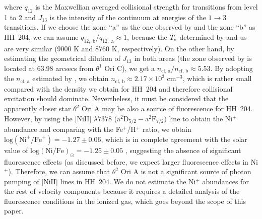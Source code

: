 \documentclass[twocolumn,linenumbers]{aastex63}
\begin{document}
\noindent where $q_{12}$ is the Maxwellian averaged collisional strength for transitions from level 1 to 2 and $J_{13}$ is the intensity of the continuum at energies of the $1 \rightarrow 3$ transitions. If we choose the zone ``a'' as the one observed by \citet{Osterbrock92} and the zone  ``b'' as HH~204, 
we can assume ${q_{12,\text{ b}}}/{q_{12,\text{ a}}}\approx 1$, because the $T_{\rm e}$ determined by \citet{Osterbrock92} and us are very similar (9000 K and 8760 K, respectively). On the other hand, by estimating the geometrical dilution of $J_{13}$ in both areas (the zone observed by \citet{Osterbrock92} is  located at 63.98 arcsecs from $\theta^{1} \text{ Ori C}$), we get a $n_{\text{cf, a}}/n_{\text{cf, b}}\approx5.53$. By adopting the $n_{\text{cf, a}}$ estimated by \citet{Bautista96}, we obtain  $n_{\text{cf, b}}\approx 2.17 \times 10^{3} \text{ cm}^{-3}$, which is rather small compared with the density we obtain for HH~204 and therefore collisional excitation should dominate. Nevertheless, it must be considered that the apparently closer star $\theta^{2} \text{ Ori A}$  may be also a source of fluorescence for HH~204. However, by using the [Ni\thinspace II] $\lambda 7378$ ($\text{a}^{2}\text{D}_{5/2}-\text{a}^{2}\text{F}_{7/2})$ line to obtain the Ni$^{+}$ abundance and comparing with the Fe$^{+}$/H$^+$ ratio, we obtain $\text{log}(\text{Ni}^{+}/\text{Fe}^{+})=-1.27 \pm 0.06$, which is in complete agreement with the solar value of $\text{log}(\text{Ni}/\text{Fe})_{\odot}=-1.25 \pm 0.05$ \citep{lodders19}, suggesting the absence of significant fluorescence effects (as discussed before, we expect larger fluorescence effects in Ni$^+$). Therefore, we can assume that $\theta^{2} \text{ Ori A}$ is not a significant source of photon pumping of [Ni\thinspace II] lines in HH~204. We do not estimate the  Ni$^{+}$ abundances for the rest of velocity components because it requires a detailed  analysis of the fluorescence conditions in the ionized gas, which goes beyond the scope of this paper. 
\end{document}
